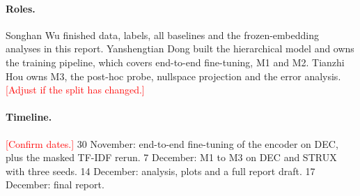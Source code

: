 \documentclass{article}
\newcommand{\todo}[1]{\textcolor{red}{[#1]}}
\begin{document}
\paragraph{Roles.}
Songhan Wu finished data, labels, all baselines and the frozen-embedding analyses in this report. Yanshengtian Dong built the hierarchical model and owns the training pipeline, which covers end-to-end fine-tuning, M1 and M2. Tianzhi Hou owns M3, the post-hoc probe, nullspace projection and the error analysis. \todo{Adjust if the split has changed.}

\paragraph{Timeline.}
\todo{Confirm dates.} 30 November: end-to-end fine-tuning of the encoder on DEC, plus the masked TF-IDF rerun. 7 December: M1 to M3 on DEC and STRUX with three seeds. 14 December: analysis, plots and a full report draft. 17 December: final report.



\end{document}
